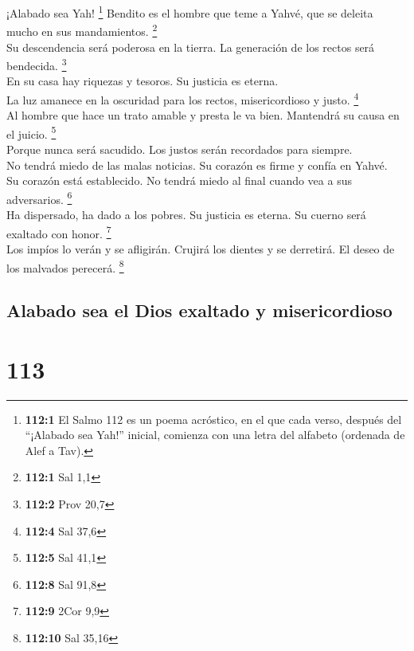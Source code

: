  ¡Alabado sea Yah! \footnote{\textbf{112:1} El Salmo 112
  es un poema acróstico, en el que cada verso, después del ``¡Alabado
  sea Yah!'' inicial, comienza con una letra del alfabeto (ordenada de
  Alef a Tav).} Bendito es el hombre que teme a Yahvé, que se deleita
mucho en sus mandamientos. \footnote{\textbf{112:1} Sal 1,1}\\
 Su descendencia será poderosa en la tierra. La generación
de los rectos será bendecida. \footnote{\textbf{112:2} Prov 20,7}\\
 En su casa hay riquezas y tesoros. Su justicia es
eterna.\\
 La luz amanece en la oscuridad para los rectos,
misericordioso y justo. \footnote{\textbf{112:4} Sal 37,6}\\
 Al hombre que hace un trato amable y presta le va bien.
Mantendrá su causa en el juicio. \footnote{\textbf{112:5} Sal 41,1}\\
 Porque nunca será sacudido. Los justos serán recordados
para siempre.\\
 No tendrá miedo de las malas noticias. Su corazón es
firme y confía en Yahvé.\\
 Su corazón está establecido. No tendrá miedo al final
cuando vea a sus adversarios. \footnote{\textbf{112:8} Sal 91,8}\\
 Ha dispersado, ha dado a los pobres. Su justicia es
eterna. Su cuerno será exaltado con honor. \footnote{\textbf{112:9} 2Cor
  9,9}\\
 Los impíos lo verán y se afligirán. Crujirá los dientes
y se derretirá. El deseo de los malvados perecerá. \footnote{\textbf{112:10}
  Sal 35,16}

\hypertarget{alabado-sea-el-dios-exaltado-y-misericordioso}{%
\subsection{Alabado sea el Dios exaltado y
misericordioso}\label{alabado-sea-el-dios-exaltado-y-misericordioso}}

\hypertarget{section-110}{%
\section{113}\label{section-110}}

